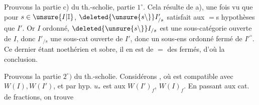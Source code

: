 Prouvons la partie c) du th.-scholie, partie $1^\circ$. Cela résulte de a), une fois vu que pour $s\in\unsure{I|\mathbb{I}}$, $\deleted{\unsure{s\backslash}}I'_{/s}$ satisfait aux $=$s hypothèses que $I'$. Or $I$  ordonné, $\deleted{\unsure{s\backslash}}I_{/s}$ est une sous-catégorie ouverte de $I$, donc $I'_{/s}$ une sous-cat ouverte de $I'$, donc  un sous-ens ordonné fermé de $I'^\circ$. Ce dernier étant noethérien et sobre, il en est de $=$ des  fermés, d'où la conclusion.

Prouvons la partie $2^\circ)$ du th.-scholie. Considérons
,
où   est compatible avec $W(I),W(I')$, et par hyp. $u_*$ est  aux $W(I')_f$, $W(I)_f$. En passant aux cat. de fractions, on trouve
